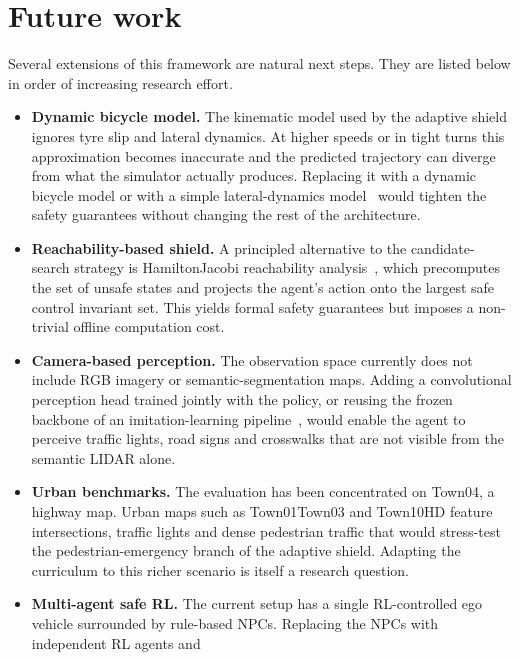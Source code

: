 \section{Future work}\label{sec:concl-future}

Several extensions of this framework are natural next steps. They are listed below in order of
increasing research effort.

\begin{itemize}
  \item \textbf{Dynamic bicycle model.} The kinematic model used by the adaptive shield ignores
        tyre slip and lateral dynamics. At higher speeds or in tight turns this approximation
        becomes inaccurate and the predicted trajectory can diverge from what the simulator
        actually produces. Replacing it with a dynamic bicycle model or with a simple
        lateral-dynamics model~\cite{rajamani2012vehicle} would tighten the safety guarantees
        without changing the rest of the architecture.
  \item \textbf{Reachability-based shield.} A principled alternative to the candidate-search
        strategy is Hamilton\textendash Jacobi reachability
        analysis~\cite{bansal2017hj,fisac2019safety}, which precomputes the set of unsafe
        states and projects the agent's action onto the largest safe control invariant set.
        This yields formal safety guarantees but imposes a non-trivial offline computation cost.
  \item \textbf{Camera-based perception.} The observation space currently does not include RGB
        imagery or semantic-segmentation maps. Adding a convolutional perception head trained
        jointly with the policy, or reusing the frozen backbone of an imitation-learning
        pipeline~\cite{chitta2023transfuser}, would enable the agent to perceive traffic lights,
        road signs and crosswalks that are not visible from the semantic LIDAR alone.
  \item \textbf{Urban benchmarks.} The evaluation has been concentrated on Town04, a highway
        map. Urban maps such as Town01\textendash Town03 and Town10HD feature intersections,
        traffic lights and dense pedestrian traffic that would stress-test the pedestrian-emergency
        branch of the adaptive shield. Adapting the curriculum to this richer scenario is itself
        a research question.
  \item \textbf{Multi-agent safe RL.} The current setup has a single RL-controlled ego vehicle
        surrounded by rule-based NPCs. Replacing the NPCs with independent RL agents and

\end{itemize}
